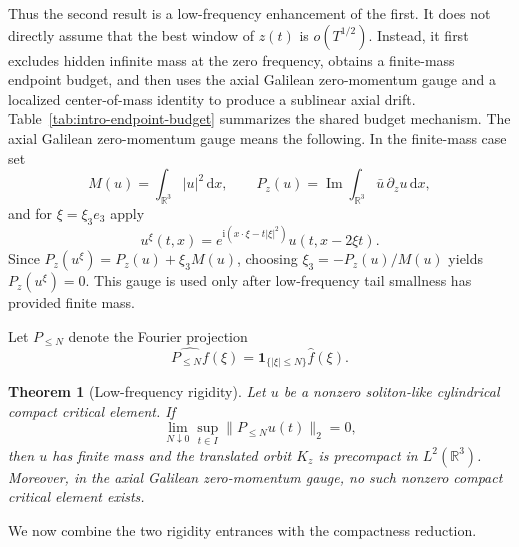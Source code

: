 \documentclass[preprint,12pt]{elsarticle}
\numberwithin{equation}{section}
\newcommand{\R}{\mathbb R}
\newcommand{\ii}{\mathrm i}
\newcommand{\dd}{\,\mathrm d}
\newcommand{\pa}{\partial}
\newcommand{\ez}{e_3}
\newcommand{\Ima}{\operatorname{Im}}
\newcommand{\one}{\mathbf 1}
\newtheorem{theorem}{Theorem}[section]
\theoremstyle{remark}
\begin{document}
Thus the second result is a low-frequency enhancement of the first.  It does not directly assume that the best window of $z(t)$ is $o(T^{1/2})$.  Instead, it first excludes hidden infinite mass at the zero frequency, obtains a finite-mass endpoint budget, and then uses the axial Galilean zero-momentum gauge and a localized center-of-mass identity to produce a sublinear axial drift.  Table~\ref{tab:intro-endpoint-budget} summarizes the shared budget mechanism.  The axial Galilean zero-momentum gauge means the following.  In the finite-mass case set
\[
  M(u)=\int_{\R^3}|u|^2\dd x,
  \qquad
  P_z(u)=\Ima\int_{\R^3}\bar u\,\pa_z u\dd x,
\]
and for $\xi=\xi_3\ez$ apply
\[
  u^\xi(t,x)=e^{\ii(x\cdot\xi-t|\xi|^2)}u(t,x-2\xi t).
\]
Since $P_z(u^\xi)=P_z(u)+\xi_3M(u)$, choosing $\xi_3=-P_z(u)/M(u)$ yields $P_z(u^\xi)=0$.  This gauge is used only after low-frequency tail smallness has provided finite mass.

Let $P_{\le N}$ denote the Fourier projection
\[
  \widehat{P_{\le N}f}(\xi)=\one_{\{|\xi|\le N\}}\widehat f(\xi).
\]

\begin{theorem}[Low-frequency rigidity]\label{thm:lowfreq-rigidity}
Let $u$ be a nonzero soliton-like cylindrical compact critical element.  If
\begin{equation}\label{eq:lowfreq-small-intro}
  \lim_{N\downarrow0}\sup_{t\in I}\|P_{\le N}u(t)\|_2=0,
\end{equation}
then $u$ has finite mass and the translated orbit $K_z$ is precompact in $L^2(\R^3)$.  Moreover, in the axial Galilean zero-momentum gauge, no such nonzero compact critical element exists.
\end{theorem}

We now combine the two rigidity entrances with the compactness reduction.
\end{document}
